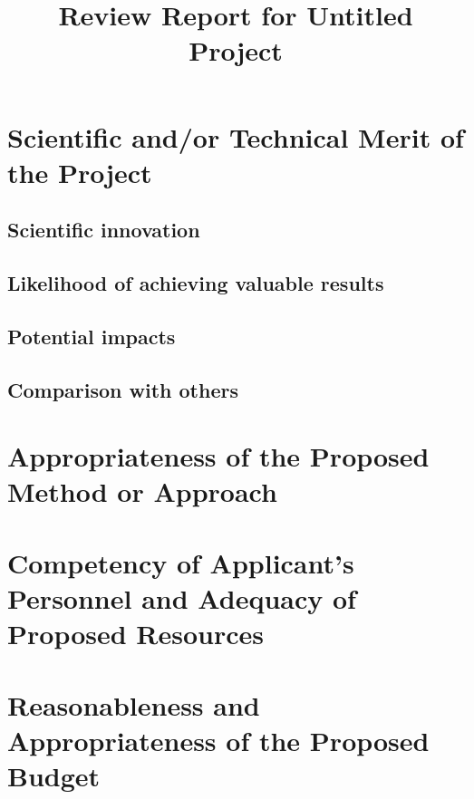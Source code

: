 \documentclass[11pt,a4paper,final]{article}
\title{Review Report for Untitled Project}
\date{}
\begin{document}
\maketitle

\section{Scientific and/or Technical Merit of the Project}

\subsection{Scientific innovation}

\subsection{Likelihood of achieving valuable results}

\subsection{Potential impacts}

\subsection{Comparison with others}

\section{Appropriateness of the Proposed Method or Approach}

\section{Competency of Applicant’s Personnel and Adequacy of Proposed Resources}

\section{Reasonableness and Appropriateness of the Proposed Budget}
\end{document}
